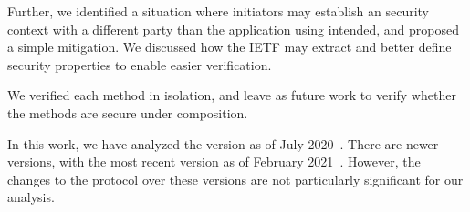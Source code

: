 \documentclass[runningheads]{llncs}
\begin{document}
\begin{table*}[t]
          \caption{Verified properties. $S_P$ contains roles,
            responder identity, session key material (excluding
            $P_I$), \mCi, \mCr, and \mSuites. $S_F$ is $S_{P}$,
            the initiator identity, and $P_I$.\\
            $\dagger$: For SIG-STAT and STAT-STAT implicit
            authentication using the full XOR model the verification
            was killed at 14246m43s and 2057m47s of computation time,
            respectively. The time reported is for verification under
            the simplified XOR modeling of message 2.\\
            $\ddagger$: When the initiator is using STAT mode we
            cannot get explicit agreement on the intiator's own key
            material, therefore in these two cases we check injective
            agreement for all key material except $P_I$.\\
          }
\end{table*}

Further, we identified a situation where initiators may establish an \mOscore{}
security context with a different party than the application using \mEdhoc{}
intended, and proposed a simple mitigation.
%
We discussed how the IETF may extract and better define security properties to
enable easier verification.

We verified each method in isolation, and leave as future work to verify whether
the methods are secure under composition.

In this work, we have analyzed the \mEdhoc{} version as of July
2020~\cite{our-analysis-selander-lake-edhoc-00}.
%
There are newer versions, with the most recent version as
of February 2021~\cite{latest-ietf-lake-edhoc-05}.
%
However, the changes to the protocol over these versions are not
particularly significant for our analysis.
%
\end{document}
